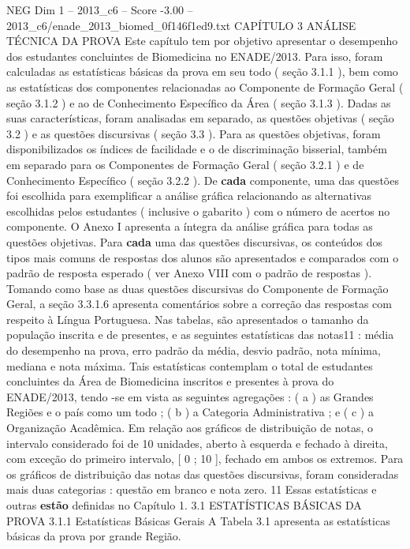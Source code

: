 \begin{textsample}{NEG Dim 1 – 2013\_c6 – Score -3.00 – 2013\_c6/enade\_2013\_biomed\_0f146f1ed9.txt}  \label{ex:f1_neg_262}
CAPÍTULO 3 ANÁLISE TÉCNICA DA PROVA Este capítulo tem por objetivo apresentar o desempenho dos estudantes concluintes de Biomedicina no ENADE/2013.
Para isso, foram calculadas as estatísticas básicas da prova em seu todo ( seção 3.1.1 ), bem como as estatísticas dos componentes relacionadas ao Componente de Formação Geral ( seção 3.1.2 ) e ao de Conhecimento Específico da Área ( seção 3.1.3 ).
Dadas as suas características, foram analisadas em separado, as questões objetivas ( seção 3.2 ) e as questões discursivas ( seção 3.3 ).
Para as questões objetivas, foram disponibilizados os índices de facilidade e o de discriminação bisserial, também em separado para os Componentes de Formação Geral ( seção 3.2.1 ) e de Conhecimento Específico ( seção 3.2.2 ).
De \textbf{cada} componente, uma das questões foi escolhida para exemplificar a análise gráfica relacionando as alternativas escolhidas pelos estudantes ( inclusive o gabarito ) com o número de acertos no componente.
O Anexo I apresenta a íntegra da análise gráfica para todas as questões objetivas.
Para \textbf{cada} uma das questões discursivas, os conteúdos dos tipos mais comuns de respostas dos alunos são apresentados e comparados com o padrão de resposta esperado ( ver Anexo VIII com o padrão de respostas ).
Tomando como base as duas questões discursivas do Componente de Formação Geral, a seção 3.3.1.6 apresenta comentários sobre a correção das respostas com respeito à Língua Portuguesa.
Nas tabelas, são apresentados o tamanho da população inscrita e de presentes, e as seguintes estatísticas das notas11 : média do desempenho na prova, erro padrão da média, desvio padrão, nota mínima, mediana e nota máxima.
Tais estatísticas contemplam o total de estudantes concluintes da Área de Biomedicina inscritos e presentes à prova do ENADE/2013, tendo -se em vista as seguintes agregações : ( a ) as Grandes Regiões e o país como um todo ; ( b ) a Categoria Administrativa ; e ( c ) a Organização Acadêmica.
Em relação aos gráficos de distribuição de notas, o intervalo considerado foi de 10 unidades, aberto à esquerda e fechado à direita, com exceção do primeiro intervalo, [ 0 ; 10 ], fechado em ambos os extremos.
Para os gráficos de distribuição das notas das questões discursivas, foram consideradas mais duas categorias : questão em branco e nota zero. 11 Essas estatísticas e outras \textbf{estão} definidas no Capítulo 1. 3.1 ESTATÍSTICAS BÁSICAS DA PROVA 3.1.1 Estatísticas Básicas Gerais A Tabela 3.1 apresenta as estatísticas básicas da prova por grande Região.

\end{textsample}
